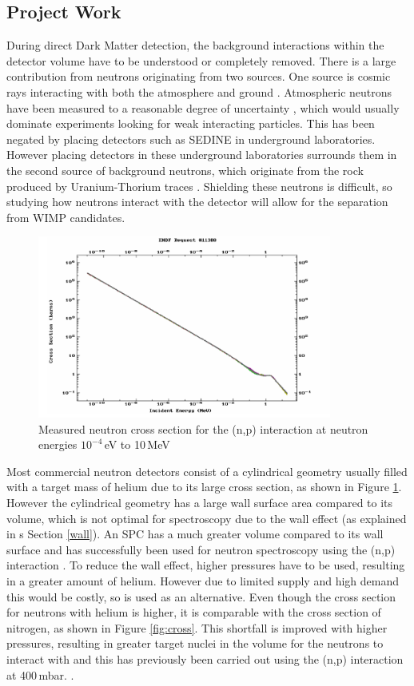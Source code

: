 \documentclass[a4paper]{article}
\begin{document}
\subsection{Project Work} \label{Project}
During direct Dark Matter detection, the background interactions within the detector volume have to be understood or completely removed. There is a large contribution from neutrons originating from two sources. One source is cosmic rays interacting with both the atmosphere and ground \cite{10.2307/984841,saxena}. Atmospheric neutrons have been measured to a reasonable degree of uncertainty \cite{flux}, which would usually dominate experiments looking for weak interacting particles. This has been negated by placing detectors such as SEDINE in underground laboratories. However placing detectors in these underground laboratories surrounds them in the second source of background neutrons, which originate from the rock produced by Uranium-Thorium traces \cite{TZIAFERI2007326}. Shielding these neutrons is difficult, so studying how neutrons interact with the detector will allow for the separation from WIMP candidates.
\begin{figure}[H]
    \centering
    \includegraphics[height=6cm]{plots/Cross.png}
    \caption{Measured neutron cross section for the (n,p) interaction at neutron energies $10^{-4}$\,eV to 10\,MeV \cite{hnps2579}}
    \label{fig:cross1}
\end{figure}
\noindent Most commercial neutron detectors consist of a cylindrical geometry usually filled with a target mass of helium due to its large cross section, as shown in Figure \ref{fig:cross1}. However the cylindrical geometry has a large wall surface area compared to its volume, which is not optimal for spectroscopy due to the wall effect (as explained in s
Section \ref{wall}). An SPC has a much greater volume compared to its wall surface and has successfully been used for neutron spectroscopy using the (n,p) interaction \cite{hnps2579}. To reduce the wall effect, higher pressures have to be used, resulting in a greater amount of helium. However due to limited supply and high demand this would be costly, so  is used as an alternative. Even though the cross section for neutrons with helium is higher, it is comparable with the cross section of nitrogen, as shown in Figure \ref{fig:cross}. This shortfall is improved with higher pressures, resulting in greater target nuclei in the volume for the neutrons to interact with and this has previously been carried out using the (n,p) interaction at 400\,mbar. \cite{BOUGAMONT201710}. 
\end{document}
